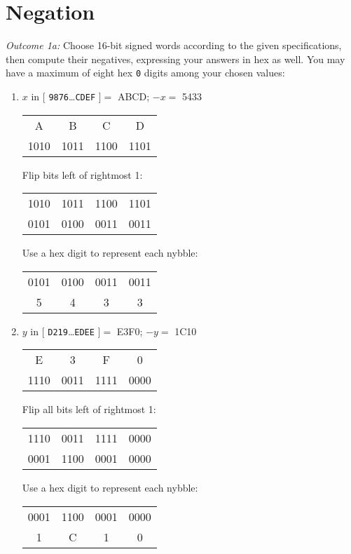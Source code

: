 \documentclass[11pt]{article}
\begin{document}
\section{Negation}

\emph{Outcome 1a:} Choose 16-bit signed words according to the given specifications, then compute
their negatives, expressing your answers in hex as well. You may have a maximum of eight hex
\texttt{0} digits among your chosen values:

\begin{enumerate}
\item \(x\) in \([\) \texttt{9876}\ldots\texttt{CDEF} \(]  =\) ABCD;
      \(-x = \) 5433

\begin{tabular}{c c c c}
A&B&C&D\\
1010&1011&1100&1101
\end{tabular}      

Flip bits left of rightmost 1:

\begin{tabular}{c c c c}
1010&1011&1100&1101\\
0101&0100&0011&0011
\end{tabular}    

Use a hex digit to represent each nybble:

\begin{tabular}{c c c c}
0101&0100&0011&0011\\
5&4&3&3
\end{tabular}    


\item \(y\) in \([\) \texttt{D219}\ldots\texttt{EDEE} \(]  =\) E3F0;
      \(-y = \) 1C10

\begin{tabular}{c c c c}
E&3&F&0\\
1110&0011&1111&0000
\end{tabular}

Flip all bits left of rightmost 1:

\begin{tabular}{c c c c}
1110&0011&1111&0000\\
0001&1100&0001&0000
\end{tabular}

Use a hex digit to represent each nybble:

\begin{tabular}{c c c c}
0001&1100&0001&0000\\
1&C&1&0
\end{tabular}


\end{enumerate}
\end{document}
